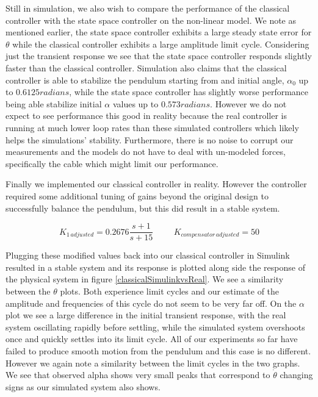 \documentclass{article}
\theoremstyle{plain}
\theoremstyle{definition}
\theoremstyle{remark}
\begin{document}
Still in simulation, we also wish to compare the performance of the classical controller with the state space controller on the non-linear model.  We note as mentioned earlier, the state space controller exhibits a large steady state error for $\theta$ while the classical controller exhibits a large amplitude limit cycle.  Considering just the transient response we see that the state space controller responds slightly faster than the classical controller.  Simulation also claims that the classical controller is able to stabilize the pendulum starting from and initial angle, $\alpha_0$ up to $0.6125 radians$, while the state space controller has slightly worse performance being able stabilize initial $\alpha$ values up to $0.573 radians$.  However we do not expect to see performance this good in reality because the real controller is running at much lower loop rates than these simulated controllers which likely helps the simulations' stability.  Furthermore, there is no noise to corrupt our measurements and the models do not have to deal with un-modeled forces, specifically the cable which might limit our performance. 

Finally we implemented our classical controller in reality.  However the controller required some additional tuning of gains beyond the original design to successfully balance the pendulum, but this did result in a stable system.

$$K_{1 \, adjusted} = 0.2676\frac{s + 1}{s + 15} \hspace{1cm} K_{compensator \, adjusted} = 50 $$

Plugging these modified values back into our classical controller in Simulink resulted in a stable system and its response is plotted along side the response of the physical system in figure \ref{classicalSimulinkvsReal}.  We see a similarity between the $\theta$ plots.  Both experience limit cycles and our estimate of the amplitude and frequencies of this cycle do not seem to be very far off.  On the $\alpha$ plot we see a large difference in the initial transient response, with the real system oscillating rapidly before settling, while the simulated system overshoots once and quickly settles into its limit cycle.  All of our experiments so far have failed to produce smooth motion from the pendulum and this case is no different.  However we again note a similarity between the limit cycles in the two graphs.  We see that observed alpha shows very small peaks that correspond to $\dot{\theta}$ changing signs as our simulated system also shows. 
\end{document}
